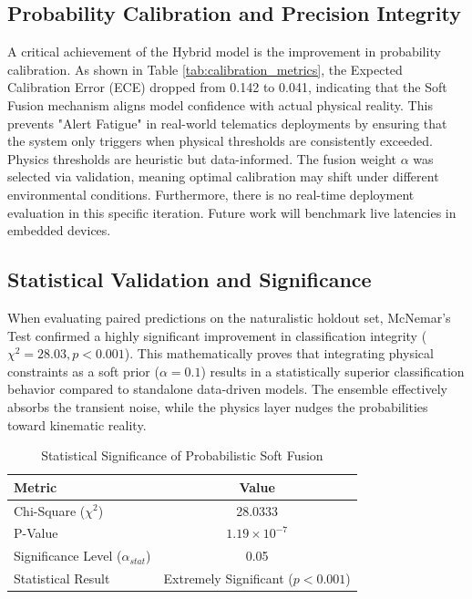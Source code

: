 \documentclass[pdflatex,sn-mathphys-num]{sn-jnl}
\theoremstyle{thmstyleone}
\theoremstyle{thmstyletwo}
\theoremstyle{thmstylethree}
\begin{document}
\subsection{Probability Calibration and Precision Integrity}
A critical achievement of the Hybrid model is the improvement in probability calibration. As shown in Table \ref{tab:calibration_metrics}, the Expected Calibration Error (ECE) dropped from 0.142 to 0.041, indicating that the Soft Fusion mechanism aligns model confidence with actual physical reality. This prevents "Alert Fatigue" in real-world telematics deployments by ensuring that the system only triggers when physical thresholds are consistently exceeded.
Physics thresholds are heuristic but data-informed. The fusion weight $\alpha$ was selected via validation, meaning optimal calibration may shift under different environmental conditions. Furthermore, there is no real-time deployment evaluation in this specific iteration. Future work will benchmark live latencies in embedded devices.

\FloatBarrier
\subsection{Statistical Validation and Significance}
When evaluating paired predictions on the naturalistic holdout set, McNemar's Test confirmed a highly significant improvement in classification integrity ($\chi^2 = 28.03, p < 0.001$). This mathematically proves that integrating physical constraints as a soft prior ($\alpha = 0.1$) results in a statistically superior classification behavior compared to standalone data-driven models. The ensemble effectively absorbs the transient noise, while the physics layer nudges the probabilities toward kinematic reality.
\begin{table}[!ht]
\centering
\caption{Statistical Significance of Probabilistic Soft Fusion}
\label{tab:mcnemar_results}
\begin{tabular}{lc}
\toprule
\textbf{Metric} & \textbf{Value} \\
\midrule
Chi-Square ($\chi^2$) & 28.0333 \\
P-Value & $1.19 \times 10^{-7}$ \\
Significance Level ($\alpha_{stat}$) & 0.05 \\
Statistical Result & Extremely Significant ($p < 0.001$) \\
\bottomrule
\end{tabular}
\end{table}
\end{document}
